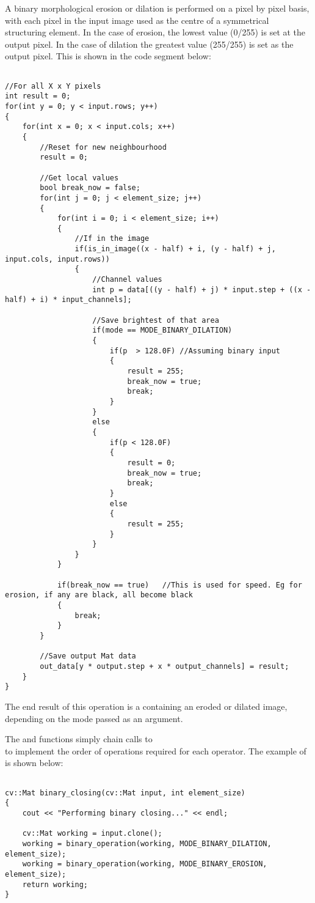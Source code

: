 			A binary morphological erosion or dilation is performed on a pixel by pixel basis, with each pixel in the input image used as the centre of a symmetrical structuring element. In the case of erosion, the lowest value (0/255) is set at the output pixel. In the case of dilation the greatest value (255/255) is set as the output pixel. This is shown in the code segment below:

			\begin{lstlisting}

//For all X x Y pixels
int result = 0;
for(int y = 0; y < input.rows; y++)
{
	for(int x = 0; x < input.cols; x++)
	{
		//Reset for new neighbourhood
		result = 0;
			
		//Get local values
		bool break_now = false;
		for(int j = 0; j < element_size; j++)
		{
			for(int i = 0; i < element_size; i++)
			{
				//If in the image
				if(is_in_image((x - half) + i, (y - half) + j, input.cols, input.rows))
				{
					//Channel values
					int p = data[((y - half) + j) * input.step + ((x - half) + i) * input_channels];

					//Save brightest of that area
					if(mode == MODE_BINARY_DILATION)
					{
						if(p  > 128.0F) //Assuming binary input
						{
							result = 255;
							break_now = true;
							break;
						}
					}
					else
					{
						if(p < 128.0F)
						{
							result = 0;
							break_now = true;
							break;
						}
						else
						{
							result = 255;
						}
					}
				}
			}

			if(break_now == true)   //This is used for speed. Eg for erosion, if any are black, all become black
			{
				break;
			}
		}
	
		//Save output Mat data
		out_data[y * output.step + x * output_channels] = result;
	}
}
			\end{lstlisting}

			The end result of this operation is a  containing an eroded or dilated image, depending on the mode passed as an argument. 

			The  and  functions simply chain calls to\\ to implement the order of operations required for each operator. The example of  is shown below:

			\begin{lstlisting}

cv::Mat binary_closing(cv::Mat input, int element_size)
{
	cout << "Performing binary closing..." << endl;

	cv::Mat working = input.clone();
	working = binary_operation(working, MODE_BINARY_DILATION, element_size);
	working = binary_operation(working, MODE_BINARY_EROSION, element_size);
	return working;
}
			\end{lstlisting}

